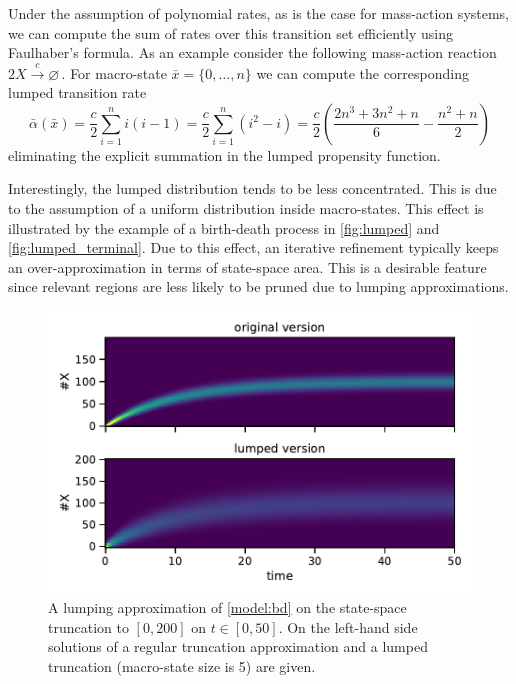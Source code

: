 Under the assumption of polynomial rates, as is the case for mass-action
systems, we can compute the sum of rates over this transition set
efficiently using Faulhaber's formula.
As an example consider the following mass-action reaction
$ 2 X \xrightarrow{c} \varnothing\,. $
For macro-state
$\bar{x} = \{0, \dots, n\}$
we can compute the corresponding lumped transition rate
$$\bar{\alpha}(\bar{x})
=\frac{c}{2}\sum_{i=1}^n i (i - 1)
=\frac{c}{2}\sum_{i=1}^n (i^2 - i)
=\frac{c}{2}\left(\frac{2n^3+3n^2+n}{6} - \frac{n^2 + n}{2}\right)$$
eliminating the explicit summation in the lumped propensity function.

Interestingly, the lumped distribution
tends to be less concentrated. %
This is due to the assumption of a
uniform distribution inside macro-states.
This effect is illustrated by the example of a birth-death process in \autoref{fig:lumped} and \autoref{fig:lumped_terminal}.
Due to this effect, an iterative refinement typically keeps an over-approximation in terms of state-space area.
This is a desirable feature since relevant regions are less likely to be pruned due to lumping approximations.
\begin{figure}
    \centering
    \includegraphics[scale=.6]{gfx/lumpedvorig.pdf}
	\caption[Lumping approximation of \autoref{model:bd}]{A lumping approximation of \autoref{model:bd} on the state-space truncation to $[0, 200]$ on $t\in[0, 50]$. On the left-hand side solutions of a regular truncation approximation and a lumped truncation (macro-state size is 5) are given.}
    \label{fig:lumped}
\end{figure}
